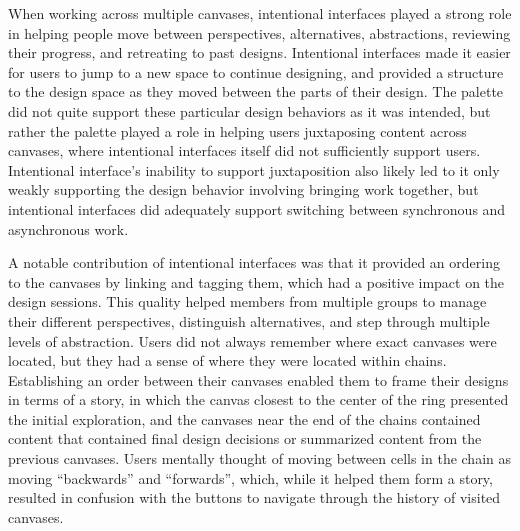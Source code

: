 When working across multiple canvases, intentional interfaces played a strong role in helping people move between perspectives, alternatives, abstractions, reviewing their progress, and retreating to past designs. Intentional interfaces made it easier for users to jump to a new space to continue designing, and provided a structure to the design space as they moved between the parts of their design. The palette did not quite support these particular design behaviors as it was intended, but rather the palette played a role in helping users juxtaposing content across canvases, where intentional interfaces itself did not sufficiently support users. Intentional interface's inability to support juxtaposition also likely led to it only weakly supporting the design behavior involving bringing work together, but intentional interfaces did adequately support switching between synchronous and asynchronous work. 


A notable contribution of intentional interfaces was that it provided an ordering to the canvases by linking and tagging them, which had a positive impact on the design sessions. This quality helped members from multiple groups to manage their different perspectives, distinguish alternatives, and step through multiple levels of abstraction. Users did not always remember where exact canvases were located, but they had a sense of where they were located within chains. Establishing an order between their canvases enabled them to frame their designs in terms of a story, in which the canvas closest to the center of the ring presented the initial exploration, and the canvases near the end of the chains contained content that contained final design decisions or summarized content from the previous canvases. Users mentally thought of moving between cells in the chain as moving ``backwards'' and ``forwards'', which, while it helped them form a story, resulted in confusion with the buttons to navigate through the history of visited canvases.

